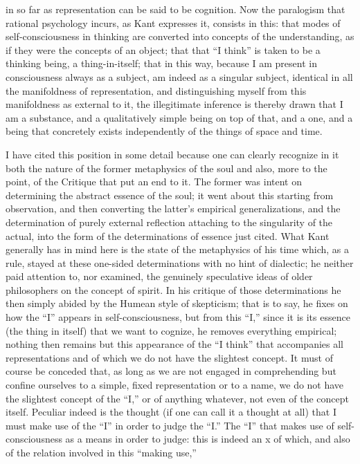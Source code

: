 in so far as representation can be said to be cognition.
Now the paralogism that rational psychology incurs,
as Kant expresses it, consists in this:
that modes of self-consciousness in thinking are
converted into concepts of the understanding,
as if they were the concepts of an object;
that that “I think” is taken to be
a thinking being, a thing-in-itself;
that in this way, because I am present
in consciousness always as a subject,
am indeed as a singular subject,
identical in all the manifoldness of representation,
and distinguishing myself from this manifoldness as external to it,
the illegitimate inference is thereby drawn that I am a substance,
and a qualitatively simple being on top of that,
and a one, and a being that concretely exists
independently of the things of space and time.

I have cited this position in some detail
because one can clearly recognize in it
both the nature of the former metaphysics of the soul
and also, more to the point, of the Critique that put an end to it.
The former was intent on determining the abstract essence of the soul;
it went about this starting from observation,
and then converting the latter's empirical generalizations,
and the determination of purely external reflection
attaching to the singularity of the actual,
into the form of the determinations of essence just cited.
What Kant generally has in mind here is
the state of the metaphysics of his time
which, as a rule, stayed at these one-sided determinations
with no hint of dialectic;
he neither paid attention to, nor examined,
the genuinely speculative ideas of older
philosophers on the concept of spirit.
In his critique of those determinations he then
simply abided by the Humean style of skepticism;
that is to say, he fixes on how the “I” appears in self-consciousness,
but from this “I,” since it is its essence
(the thing in itself) that we want to cognize,
he removes everything empirical;
nothing then remains but this appearance of the “I think”
that accompanies all representations
and of which we do not have the slightest concept.
It must of course be conceded that,
as long as we are not engaged in comprehending
but confine ourselves to a simple, fixed representation or to a name,
we do not have the slightest concept of the “I,”
or of anything whatever, not even of the concept itself.
Peculiar indeed is the thought
(if one can call it a thought at all)
that I must make use of the “I” in order to judge the “I.”
The “I” that makes use of self-consciousness
as a means in order to judge:
this is indeed an x of which,
and also of the relation involved in this “making use,”
